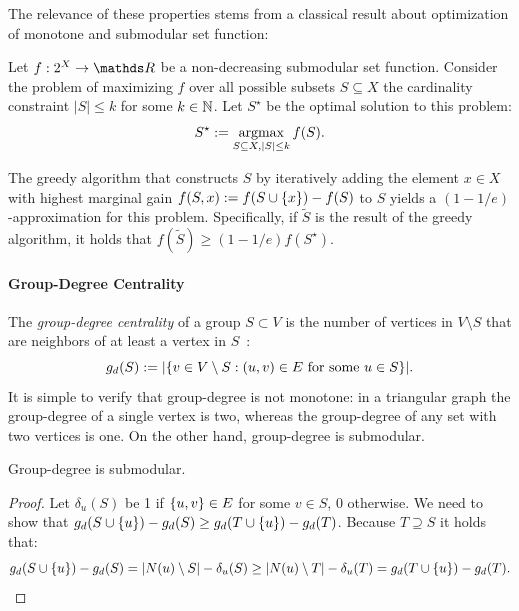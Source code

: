 The relevance of these properties stems from a classical result
about optimization of monotone and submodular set function:

\begin{proposition}
\label{prop:prelim:greedy-apx}
Let $f : 2^X \to \real$ be a non-decreasing submodular set function.
Consider the problem of maximizing $f$ over all possible subsets
$S \subseteq X$ \wrt the cardinality constraint $|S| \le k$ for
some $k \in \mathbb{N}$. Let $S^\star$ be the optimal solution to this
problem:
%
\[
    S^\star := \operatorname*{argmax}_{S \subseteq X, |S| \le k}f(S).
\]

The greedy algorithm that constructs $S$ by iteratively
adding the element $x \in X$ with highest marginal gain
$f(S, x) := f(S \cup \set{x}) - f(S)$ to $S$ yields a
$(1 - 1/e)$-approximation for this problem. Specifically,
if $\tilde{S}$ is the result of the greedy algorithm, it holds
that $f(\tilde{S}) \ge (1 - 1/e)f(S^\star)$.
\end{proposition}

\paragraph{Group-Degree Centrality}
The \emph{group-degree centrality} of a group $S\subset V$ is the number
of vertices in $V\setminus S$ that are neighbors of at least a vertex in
$S$~\cite{everett1999centrality}:
%
\[\gdeg(S) := \left|\set{v \in V \setminus S : (u, v)\in E\ \text{for some}\ u \in S}\right|.\]
%
%
It is simple to verify that group-degree is not monotone: in a triangular
graph the group-degree of a single vertex is two, whereas the group-degree
of any set with two vertices is one.
On the other hand, group-degree is submodular.

\begin{lemma}
Group-degree is submodular.
\end{lemma}

\begin{proof}
Let $\delta_u(S)$ be 1 if $\set{u, v} \in E$ for some $v \in S$, 0 otherwise.
We need to show that $\gdeg(S \cup \set{u}) - \gdeg(S) \ge \gdeg(T \cup
\set{u}) - \gdeg(T)$. Because $T \supseteq S$ it holds that:
%
\[\gdeg(S \cup \set{u}) - \gdeg(S) = |N(u) \setminus S| - \delta_u(S) \ge
|N(u) \setminus T| - \delta_u(T) = \gdeg(T \cup \set{u}) - \gdeg(T).\]
%
\end{proof}

